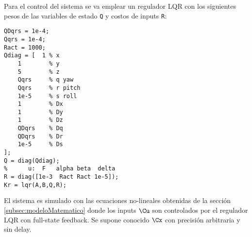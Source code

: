
Para el control del sistema se va emplear un regulador LQR con los siguientes pesos de las variables de estado \texttt{Q} y costos de inputs \texttt{R}:
\begin{lstlisting}[caption={Definición de pesos y costos del regulador LQR.}]
QDqrs = 1e-4;
Qqrs = 1e-4;
Ract = 1000; 
Qdiag = [  1 % x 
	1        % y
	5        % z
	Qqrs     % q yaw 
	Qqrs     % r pitch
	1e-5     % s roll
	1        % Dx
	1        % Dy
	1        % Dz
	QDqrs    % Dq
	QDqrs    % Dr
	1e-5     % Ds
];
Q = diag(Qdiag);
%      u:  F   alpha beta  delta
R = diag([1e-3  Ract Ract 1e-5]);
Kr = lqr(A,B,Q,R);
\end{lstlisting}
El sistema es simulado con las ecuaciones no-lineales obtenidas de la sección \ref{subsec:modeloMatematico} donde los inputs $\Cu$ son controlados por el regulador LQR con full-state feedback. Se supone conocido $\Cx$ con precisión arbitraria y sin delay. 


%
%

%


